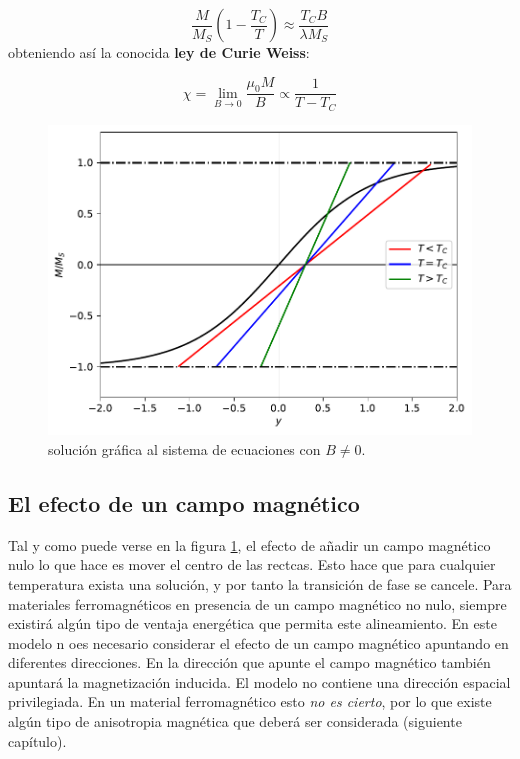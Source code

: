 \documentclass[12pt,a4paper]{book}
\numberwithin{equation}{section}
\numberwithin{figure}{section}
\newcommand{\parentesis}[1]{\left( #1  \right)}
\begin{document}
\begin{equation}
    \frac{M}{M_S} \parentesis{1-\frac{T_C}{T}} \approx \frac{T_C B}{\lambda M_S}
\end{equation}
obteniendo así la conocida \textbf{ley de Curie Weiss}:

\begin{equation}
    \chi = \lim_{B \rightarrow 0} \frac{\mu_0 M}{B} \varpropto \frac{1}{T-T_C}
\end{equation}

\begin{figure}[h!]
    \centering
    \includegraphics[scale=1]{05-TC-B.pdf}
    \caption{solución gráfica al sistema de ecuaciones con $B\neq 0$.}
    \label{Fig:05-01-03}
\end{figure}




\subsection{El efecto de un campo magnético}

Tal y como puede verse en la figura \ref{Fig:05-01-03}, el efecto de añadir un campo magnético nulo lo que hace es mover el centro de las rectcas. Esto hace que para cualquier temperatura exista una solución, y por tanto la transición de fase se cancele. Para materiales ferromagnéticos en presencia de un campo magnético no nulo, siempre existirá algún tipo de ventaja energética que permita este alineamiento. En este modelo n oes necesario considerar el efecto de un campo magnético apuntando en diferentes direcciones. En la dirección  que apunte el campo magnético también apuntará la magnetización inducida. El modelo no contiene una dirección espacial privilegiada. En un material ferromagnético esto \textit{no es cierto}, por lo que existe algún tipo de anisotropia magnética que deberá ser considerada (siguiente capítulo).  \\
\end{document}
